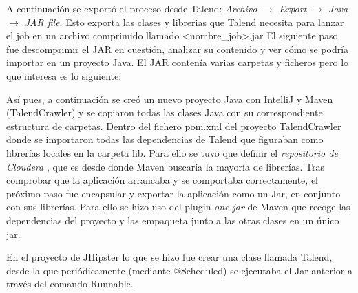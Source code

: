 A continuación se exportó el proceso desde Talend: 
\textit{Archivo $\rightarrow$ Export $\rightarrow$ Java $\rightarrow$ JAR file}. Esto exporta las clases y librerias que Talend necesita para lanzar el job en un archivo comprimido llamado <nombre\_job>.jar
El siguiente paso fue descomprimir el JAR en cuestión, analizar su contenido y ver cómo se podría importar en un proyecto Java. El JAR contenía varias carpetas y ficheros pero lo que interesa es lo siguiente:
\bigskip
\par 
{}
\bigskip
\par
Así pues, a continuación se creó un nuevo proyecto Java con IntelliJ y Maven (TalendCrawler) y se copiaron todas las clases Java con su correspondiente estructura de carpetas. Dentro del fichero pom.xml del proyecto TalendCrawler donde se importaron todas las dependencias de Talend que figuraban como librerías locales en la carpeta lib. Para ello se tuvo que definir el \textit{repositorio de Cloudera} \cite{cloudera}, que es desde donde Maven buscaría la mayoría de librerías. Tras comprobar que la aplicación arrancaba y se comportaba correctamente, el próximo paso fue encapsular y exportar la aplicación como un Jar, en conjunto con sus librerías. Para ello se hizo uso del plugin \textit{one-jar} de Maven que recoge las dependencias del proyecto y las empaqueta junto a las otras clases en un único jar.\par 

En el proyecto de JHipster lo que se hizo fue crear una clase llamada Talend, desde la que periódicamente (mediante @Scheduled) se ejecutaba el Jar anterior a través del comando Runnable. 

